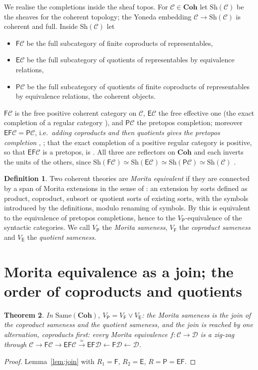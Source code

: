 \documentclass[11pt]{amsart}
\newtheorem{thm}{Theorem}[section]
\theoremstyle{definition}
\newtheorem{defi}[thm]{Definition}
\newcommand{\Same}{\mathrm{Same}}
\newcommand{\Coh}{\mathbf{Coh}}
\newcommand{\Sh}{\mathrm{Sh}}
\newcommand{\FF}{\mathsf F}
\newcommand{\EE}{\mathsf E}
\newcommand{\PP}{\mathsf P}
\newcommand{\cC}{\mathcal C}
\newcommand{\cD}{\mathcal D}
\begin{document}
We realise the completions inside the sheaf topos. For $\cC\in\Coh$ let
$\Sh(\cC)$ be the sheaves for the coherent topology; the Yoneda
embedding $\cC\to\Sh(\cC)$ is coherent and full. Inside $\Sh(\cC)$ let
\begin{itemize}
\item $\FF\cC$ be the full subcategory of finite coproducts of
representables,
\item $\EE\cC$ be the full subcategory of quotients of representables by
equivalence relations,
\item $\PP\cC$ be the full subcategory of quotients of finite coproducts
of representables by equivalence relations, the coherent objects.
\end{itemize}
$\FF\cC$ is the free positive coherent category on $\cC$, $\EE\cC$ the
free effective one (the exact completion of a regular category
\cite{CV98}), and $\PP\cC$ the pretopos completion; moreover $\EE\FF\cC
=\PP\cC$, i.e.\ \emph{adding coproducts and then quotients gives the
pretopos completion} \cite[8.4]{MR77}, \cite[p.~20]{Tsem17}; that the exact completion
of a positive regular category is positive, so that $\EE\FF\cC$ is a
pretopos, is \cite[Thm.~2.3]{LV01}. All three
are reflectors on $\Coh$ and each inverts the units of the others,
since $\Sh(\FF\cC)\simeq\Sh(\EE\cC)\simeq\Sh(\PP\cC)\simeq\Sh(\cC)$
\cite[D3.3]{Elephant}.

\begin{defi}
Two coherent theories are \emph{Morita equivalent} if they are connected
by a span of Morita extensions in the sense of \cite{BH16,Tsem17}: an
extension by sorts defined as product, coproduct, subsort or quotient
sorts of existing sorts, with the symbols introduced by the definitions,
modulo renaming of symbols. By \cite[Thm.~4.7, Cor.~4.9]{Tsem17} this is
equivalent to the equivalence of pretopos completions, hence to the
$V_\PP$-equivalence of the syntactic categories. We call $V_\PP$ the
\emph{Morita sameness}, $V_\FF$ the \emph{coproduct sameness} and
$V_\EE$ the \emph{quotient sameness}.
\end{defi}

\section{Morita equivalence as a join; the order of coproducts and quotients}\label{sec:join}

\begin{thm}\label{thm:join}
In $\Same(\Coh)$, $V_\PP=V_\FF\vee V_\EE$: the Morita sameness is the
join of the coproduct sameness and the quotient sameness, and the join
is reached by one alternation, coproducts first: every Morita
equivalence $f\colon\cC\to\cD$ is a zig-zag through $\cC\to\FF\cC\to
\EE\FF\cC\xrightarrow{\ \simeq\ }\EE\FF\cD\leftarrow\FF\cD\leftarrow\cD$.
\end{thm}
\begin{proof}
Lemma~\ref{lem:join} with $R_1=\FF$, $R_2=\EE$, $R=\PP=\EE\FF$.
\end{proof}
\end{document}
